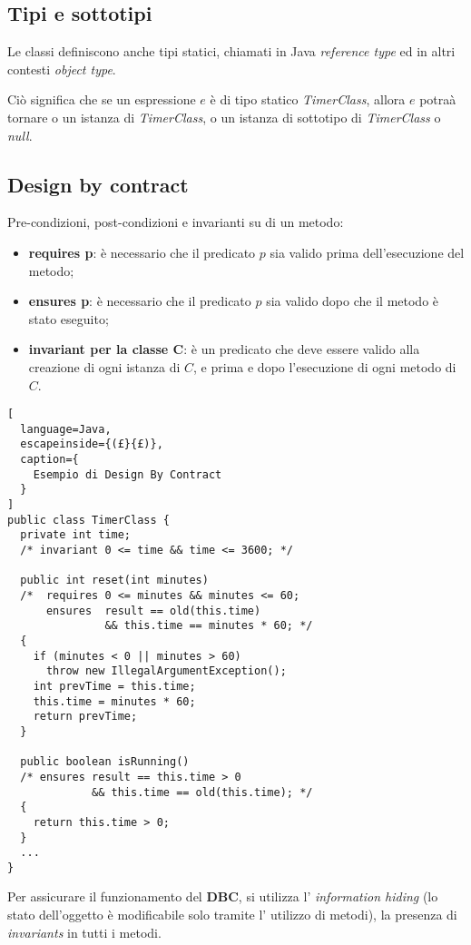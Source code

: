 \subsection{Tipi e sottotipi}
Le classi definiscono anche tipi statici, chiamati in Java \emph{reference
type} ed in altri contesti \emph{object type}.

Ciò significa che se un espressione $e$ è di tipo statico \emph{TimerClass},
allora $e$ potraà tornare o un istanza di \emph{TimerClass}, o un istanza
di sottotipo di \emph{TimerClass} o \emph{null}.

\subsection{Design by contract}
Pre-condizioni, post-condizioni e invarianti su di un metodo:
\begin{itemize}
  \item \textbf{requires p}: è necessario che il predicato $p$ sia valido
    prima dell'esecuzione del metodo;
  \item \textbf{ensures p}: è necessario che il predicato $p$ sia valido dopo
    che il metodo è stato eseguito;
  \item \textbf{invariant per la classe C}: è un predicato che deve essere
    valido alla creazione di ogni istanza di $C$, e prima e dopo l'esecuzione
    di ogni metodo di $C$.
\end{itemize}

\begin{lstlisting}[
  language=Java,
  escapeinside={(£}{£)},
  caption={
    Esempio di Design By Contract
  }
]
public class TimerClass {
  private int time;
  /* invariant 0 <= time && time <= 3600; */

  public int reset(int minutes)
  /*  requires 0 <= minutes && minutes <= 60;
      ensures  result == old(this.time)
               && this.time == minutes * 60; */
  {
    if (minutes < 0 || minutes > 60)
      throw new IllegalArgumentException();
    int prevTime = this.time;
    this.time = minutes * 60;
    return prevTime;
  }

  public boolean isRunning()
  /* ensures result == this.time > 0
             && this.time == old(this.time); */
  {
    return this.time > 0;
  }
  ...
}
\end{lstlisting}

Per assicurare il funzionamento del \textbf{DBC}, si utilizza l' \emph{
information hiding} (lo stato dell'oggetto è modificabile solo tramite l'
utilizzo di metodi), la presenza di \emph{invariants} in tutti i metodi.

